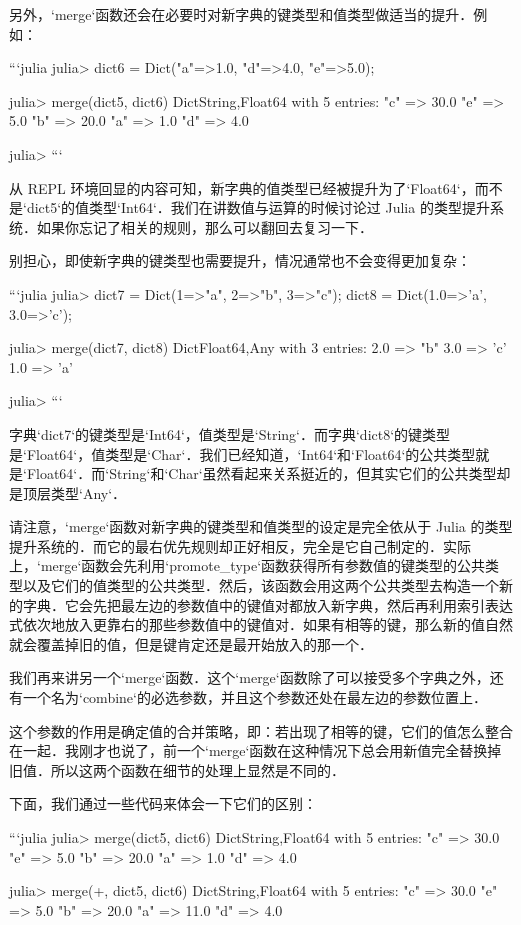 另外，`merge`函数还会在必要时对新字典的键类型和值类型做适当的提升．例如：

```julia
julia> dict6 = Dict("a"=>1.0, "d"=>4.0, "e"=>5.0);

julia> merge(dict5, dict6)
Dict{String,Float64} with 5 entries:
  "c" => 30.0
  "e" => 5.0
  "b" => 20.0
  "a" => 1.0
  "d" => 4.0

julia> 
```

从 REPL 环境回显的内容可知，新字典的值类型已经被提升为了`Float64`，而不是`dict5`的值类型`Int64`．我们在讲数值与运算的时候讨论过 Julia 的类型提升系统．如果你忘记了相关的规则，那么可以翻回去复习一下．

别担心，即使新字典的键类型也需要提升，情况通常也不会变得更加复杂：

```julia
julia> dict7 = Dict(1=>"a", 2=>"b", 3=>"c"); dict8 = Dict(1.0=>'a', 3.0=>'c');

julia> merge(dict7, dict8)
Dict{Float64,Any} with 3 entries:
  2.0 => "b"
  3.0 => 'c'
  1.0 => 'a'

julia> 
```

字典`dict7`的键类型是`Int64`，值类型是`String`．而字典`dict8`的键类型是`Float64`，值类型是`Char`．我们已经知道，`Int64`和`Float64`的公共类型就是`Float64`．而`String`和`Char`虽然看起来关系挺近的，但其实它们的公共类型却是顶层类型`Any`．

请注意，`merge`函数对新字典的键类型和值类型的设定是完全依从于 Julia 的类型提升系统的．而它的最右优先规则却正好相反，完全是它自己制定的．实际上，`merge`函数会先利用`promote_type`函数获得所有参数值的键类型的公共类型以及它们的值类型的公共类型．然后，该函数会用这两个公共类型去构造一个新的字典．它会先把最左边的参数值中的键值对都放入新字典，然后再利用索引表达式依次地放入更靠右的那些参数值中的键值对．如果有相等的键，那么新的值自然就会覆盖掉旧的值，但是键肯定还是最开始放入的那一个．

我们再来讲另一个`merge`函数．这个`merge`函数除了可以接受多个字典之外，还有一个名为`combine`的必选参数，并且这个参数还处在最左边的参数位置上．

这个参数的作用是确定值的合并策略，即：若出现了相等的键，它们的值怎么整合在一起．我刚才也说了，前一个`merge`函数在这种情况下总会用新值完全替换掉旧值．所以这两个函数在细节的处理上显然是不同的．

下面，我们通过一些代码来体会一下它们的区别：

```julia
julia> merge(dict5, dict6)
Dict{String,Float64} with 5 entries:
  "c" => 30.0
  "e" => 5.0
  "b" => 20.0
  "a" => 1.0
  "d" => 4.0

julia> merge(+, dict5, dict6)
Dict{String,Float64} with 5 entries:
  "c" => 30.0
  "e" => 5.0
  "b" => 20.0
  "a" => 11.0
  "d" => 4.0

